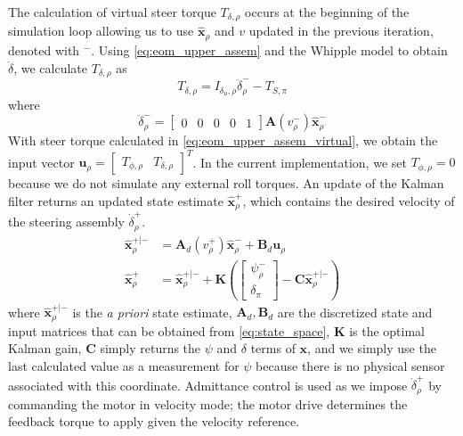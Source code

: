 \documentclass{icsc2017a}
\newcommand{\state}{\bm{x}}
\newcommand{\sysInput}{\bm{u}}
\newcommand{\stateMat}{\bm{A}}
\newcommand{\inputMat}{\bm{B}}
\newcommand{\outputMat}{\bm{C}}
\newcommand{\stateEst}{\hat{\bm{x}}}
\newcommand{\yaw}{\psi}
\newcommand{\roll}{\phi}
\newcommand{\steer}{\delta}
\newcommand{\steerRate}{\dot{\delta}}
\newcommand{\steerAccel}{\ddot{\delta}}
\newcommand{\pre}{-}
\newcommand{\post}{+}
\newcommand{\virtual}{\rho}
\newcommand{\physical}{\pi}
\begin{document}
The calculation of virtual steer torque $T_{\steer,\virtual}$ occurs at the beginning of the simulation loop allowing us
to use $\stateEst_\virtual$ and $v$ updated in the previous iteration, denoted with $^{\pre}$.
Using \autoref{eq:eom_upper_assem} and the Whipple model to obtain $\steerAccel$, we calculate $T_{\steer,\virtual}$ as
\begin{equation}
    T_{\steer,\virtual} = I_{\steer_u,\virtual} \steerAccel_\virtual^\pre - T_{S,\physical} \label{eq:eom_upper_assem_virtual}
\end{equation}
where
\begin{equation}
    \steerAccel_\virtual^\pre = \begin{bmatrix} 0 & 0 & 0 & 0 & 1 \end{bmatrix}
    \stateMat{( v_\virtual^\pre)} \stateEst_\virtual^\pre \label{eq:steer_accel_virtual_pre}
\end{equation}
With steer torque calculated in \autoref{eq:eom_upper_assem_virtual}, we obtain the input vector
$\sysInput_\virtual = \begin{bmatrix} T_{\roll,\virtual} & T_{\steer,\virtual} \end{bmatrix}^T$.
In the current implementation, we set $T_{\roll,\virtual} = 0$ because we do not simulate any external roll torques.
An update of the Kalman filter returns an updated state estimate $\stateEst^\post_\virtual$, which contains the desired
velocity of the steering assembly $\steerRate^\post_\virtual$.
\begin{equation}
\begin{aligned}
\label{eq:kalman_update}
    \stateEst^{\post|\pre}_\virtual &= \stateMat_d{(v^\post_\virtual)} \stateEst^\pre_\virtual + \inputMat_d \sysInput_\virtual\\
    \stateEst^\post_\virtual &= \stateEst^{\post|\pre}_\virtual + \bm{K}(
            \begin{bmatrix} \yaw^\pre_\virtual \\ \steer_\physical \end{bmatrix} -
                \outputMat \stateEst^{\post|\pre}_\virtual)
\end{aligned}
\end{equation}
where $\stateEst^{\post|\pre}_\virtual$ is the \emph{a priori} state estimate,
$\stateMat_d, \inputMat_d$ are the discretized state and input matrices that can be obtained from \autoref{eq:state_space},
$\bm{K}$ is the optimal Kalman gain,
$\outputMat$ simply returns the $\yaw$ and $\steer$ terms of $\state$,
and we simply use the last calculated value as a measurement for $\yaw$ because there is no physical sensor associated
with this coordinate.
Admittance control is used as we impose $\steerRate^\post_\virtual$ by commanding the motor in velocity mode;
the motor drive determines the feedback torque to apply given the velocity reference.
\end{document}
